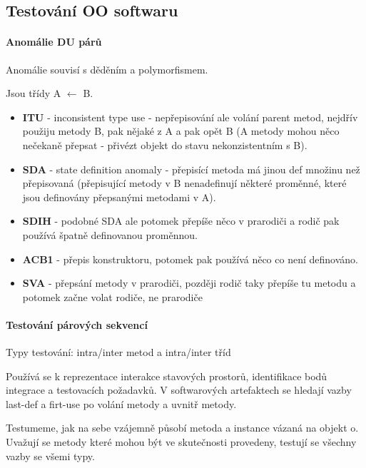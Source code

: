 \subsection{Testování OO softwaru}

\paragraph{Anomálie DU párů}

Anomálie souvisí s děděním a polymorfismem.

Jsou třídy A $\leftarrow$ B.

\begin{itemize}[itemsep=0px]
\item \textbf{ITU} - inconsistent type use - nepřepisování ale volání parent metod, nejdřív použiju metody B, pak nějaké z A a pak opět B (A metody mohou něco nečekaně přepsat - přivézt objekt do stavu nekonzistentním s B).

\item \textbf{SDA} - state definition anomaly - přepisící metoda má jinou def množinu než přepisovaná (přepisující metody v B nenadefinují některé proměnné, které jsou definovány přepsanými metodami v A).

\item \textbf{SDIH} - podobné SDA ale potomek přepíše něco v prarodiči a rodič pak používá špatně definovanou proměnnou.

\item \textbf{ACB1} - přepis konstruktoru, potomek pak používá něco co není definováno.

\item \textbf{SVA} - přepsání metody v prarodiči, později rodič taky přepíše tu metodu a potomek začne volat rodiče, ne prarodiče
\end{itemize}

\paragraph{Testování párových sekvencí}

Typy testování: intra/inter metod a intra/inter tříd

Používá se k reprezentace interakce stavových prostorů, identifikace bodů integrace a testovacích požadavků. V softwarových artefaktech se hledají vazby last-def a firt-use po volání metody a uvnitř metody.

Testumeme, jak na sebe vzájemně působí metoda a instance vázaná na objekt o. Uvažují se metody které mohou být ve skutečnosti provedeny, testují se všechny vazby se všemi typy.
